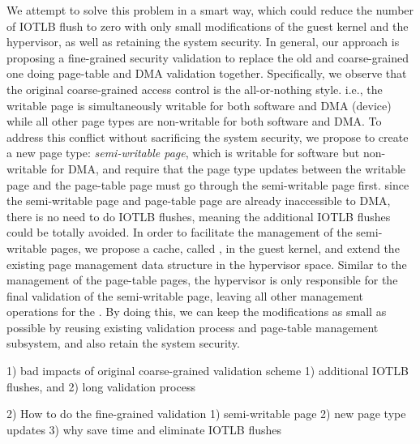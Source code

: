 We attempt to solve this problem in a smart way, which could reduce the number of IOTLB flush to zero with only small modifications of the guest kernel and the hypervisor,
as well as retaining the system security.
In general, our approach is proposing a fine-grained security validation to replace the old and coarse-grained one doing page-table and DMA validation together.
Specifically, we observe that the original coarse-grained access control is the all-or-nothing style. i.e., the writable page is simultaneously writable for both software and DMA (device) while all other page types are non-writable for both software and DMA.
To address this conflict without sacrificing the system security, we propose to create a new page type: \emph{semi-writable page}, which is writable for software but non-writable for DMA,
and require that the page type updates between the writable page and the page-table page must go through the semi-writable page first.
since the semi-writable page and page-table page are already inaccessible to DMA, there is no need to do IOTLB flushes, meaning the additional IOTLB flushes could be totally avoided.
In order to facilitate the management of the semi-writable pages, we propose a cache, called \cache, in the guest kernel, and extend the existing page management data structure in the hypervisor space.
Similar to the management of the page-table pages, the hypervisor is only responsible for the final validation of the semi-writable page, leaving all other management operations for the \cache.
By doing this, we can keep the modifications as small as possible by reusing existing validation process and page-table management subsystem, and also retain the system security.

1) bad impacts of original coarse-grained validation scheme 1) additional IOTLB flushes, and 2) long validation process

2) How to do the fine-grained validation 1) semi-writable page 2) new page type updates 3) why save time and eliminate IOTLB flushes
